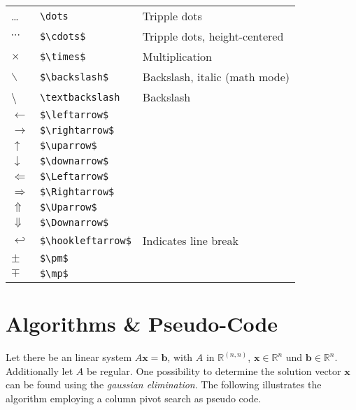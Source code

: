 \begin{table}[H]
{\begin{tabular}{ l l l }
		\dots               & \verb$\dots$          & Tripple dots\\ 
		$\cdots$            & \verb&$\cdots$&       & Tripple dots, height-centered\\ 
		$\times$            & \verb&$\times$&       & Multiplication\\ 
		$\backslash$        & \verb&$\backslash$&   & Backslash, italic (math mode)\\ 
		\textbackslash      & \verb$\textbackslash$ & Backslash\\ 
		$\leftarrow$        & \verb&$\leftarrow$&   & \\ 
		$\rightarrow$       & \verb&$\rightarrow$&  & \\ 
		$\uparrow$          & \verb&$\uparrow$&     & \\ 
		$\downarrow$        & \verb&$\downarrow$&   & \\ 
		$\Leftarrow$        & \verb&$\Leftarrow$&   & \\ 
		$\Rightarrow$       & \verb&$\Rightarrow$&  & \\ 
		$\Uparrow$          & \verb&$\Uparrow$&     & \\ 
		$\Downarrow$        & \verb&$\Downarrow$&   & \\ 
		$\hookleftarrow$    & \verb&$\hookleftarrow$& & Indicates line break\\ 
		$\pm$               & \verb&$\pm$&          & \\ 
		$\mp$               & \verb&$\mp$&          & \\ 
		\bottomrule
		\end{tabular}
} %
\end{table}

\section{Algorithms \& Pseudo-Code}
\label{sec:math}

Let there be an linear system $A \textbf{x} = \textbf{b}$, with  $A$ in $\mathds{R}^{(n, n)}$, $\textbf{x} \in \mathds{R}^n$ und $\textbf{b} \in \mathds{R}^n$. Additionally let $A$ be regular. One possibility to determine the solution vector $\textbf{x}$ can be found using the \emph{gaussian elimination}. The following illustrates the algorithm employing a column pivot search as pseudo code.

